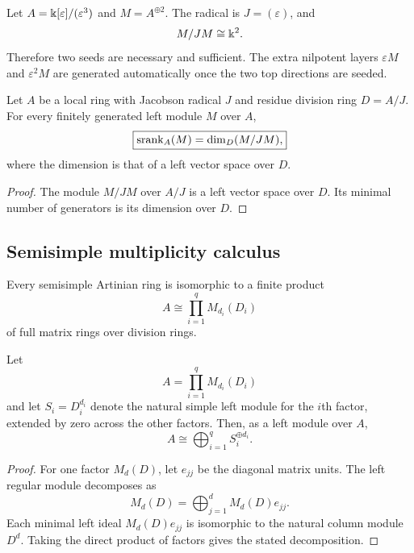 \begin{microexample}[title={A local nilpotent algebra}]
Let \(A=\Bbbk[\varepsilon]/(\varepsilon^3)\) and \(M=A^{\oplus2}\).  The radical is \(J=(\varepsilon)\), and
\[
M/JM\cong\Bbbk^2.
\]
Therefore two seeds are necessary and sufficient.  The extra nilpotent layers \(\varepsilon M\) and \(\varepsilon^2M\) are generated automatically once the two top directions are seeded.
\end{microexample}


\begin{corollary}
\label{cor:local-algebra-formula}
Let $A$ be a local ring with Jacobson radical $J$ and residue division ring $D=A/J$.  For every finitely generated left module $M$ over $A$,
\[
\boxed{
\operatorname{srank}_A(M)=\dim_D(M/JM),
}
\]
where the dimension is that of a left vector space over $D$.
\end{corollary}

\begin{proof}
The module $M/JM$ over $A/J$ is a left vector space over $D$.  Its minimal number of generators is its dimension over $D$.
\end{proof}

\subsection{Semisimple multiplicity calculus}
\begin{classicalinput}
\label{ci:wedderburn}
Every semisimple Artinian ring is isomorphic to a finite product
\[
A\cong\prod_{i=1}^{q}M_{d_i}(D_i)
\]
of full matrix rings over division rings.
\end{classicalinput}

\begin{lemma}
\label{lem:regular-multiplicities}
Let
\[
A=\prod_{i=1}^{q}M_{d_i}(D_i)
\]
and let $S_i=D_i^{d_i}$ denote the natural simple left module for the $i$th factor, extended by zero across the other factors.  Then, as a left module over $A$,
\[
\boxed{A\cong\bigoplus_{i=1}^{q}S_i^{\oplus d_i}.}
\]
\end{lemma}

\begin{proof}
For one factor $M_d(D)$, let $e_{jj}$ be the diagonal matrix units.  The left regular module decomposes as
\[
M_d(D)=\bigoplus_{j=1}^{d}M_d(D)e_{jj}.
\]
Each minimal left ideal $M_d(D)e_{jj}$ is isomorphic to the natural column module $D^d$.  Taking the direct product of factors gives the stated decomposition.
\end{proof}

